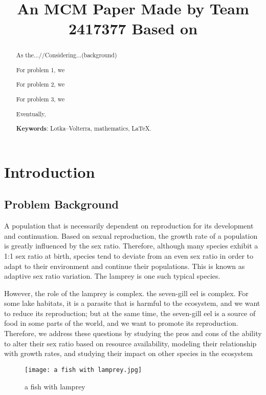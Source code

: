 \documentclass[12pt]{article}  %
\title{An MCM Paper Made by Team 2417377 Based on}  %
\begin{document}
\begin{abstract}
    As the...//Considering...(background)

    For problem 1, we

    For problem 2, we 

    For problem 3, we
    
    Eventually,  

    \vspace{5pt}
    \textbf{Keywords}: Lotka–Volterra, mathematics, \LaTeX.

\end{abstract}

\maketitle  %
\tableofcontents  %


\section{Introduction}
\subsection{Problem Background}
A population that is necessarily dependent on reproduction for its development and continuation. Based on sexual reproduction, the growth rate of a population is greatly influenced by the sex ratio. Therefore, although many species exhibit a 1:1 sex ratio at birth, species tend to deviate from an even sex ratio in order to adapt to their environment and continue their populations. This is known as adaptive sex ratio variation.\cite{1} The lamprey is one such typical species.

However, the role of the lamprey is complex. the seven-gill eel is complex. For some lake habitats, it is a parasite that is harmful to the ecosystem, and we want to reduce its reproduction; but at the same time, the seven-gill eel is a source of food in some parts of the world, and we want to promote its reproduction.\cite{2} Therefore, we address these questions by studying the pros and cons of the ability to alter their sex ratio based on resource availability, modeling their relationship with growth rates, and studying their impact on other species in the ecosystem

\begin{figure}[htbp]
	\centering
	\texttt{[image: a fish with lamprey.jpg]}
	\caption{a fish with lamprey}\label{fig:001}
\end{figure}
\end{document}

